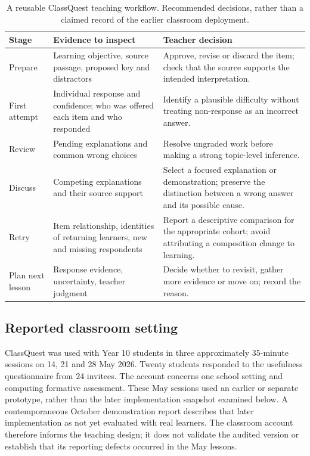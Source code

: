 \begin{table}[t]
\caption{A reusable ClassQuest teaching workflow. Recommended decisions, rather than a claimed record of the earlier classroom deployment.}
\label{tab:workflow}
\begin{tabular}{@{}p{}p{}p{}@{}}
\toprule
Stage & Evidence to inspect & Teacher decision\\
\midrule
Prepare & Learning objective, source passage, proposed key and distractors & Approve, revise or discard the item; check that the source supports the intended interpretation.\\
First attempt & Individual response and confidence; who was offered each item and who responded & Identify a plausible difficulty without treating non-response as an incorrect answer.\\
Review & Pending explanations and common wrong choices & Resolve ungraded work before making a strong topic-level inference.\\
Discuss & Competing explanations and their source support & Select a focused explanation or demonstration; preserve the distinction between a wrong answer and its possible cause.\\
Retry & Item relationship, identities of returning learners, new and missing respondents & Report a descriptive comparison for the appropriate cohort; avoid attributing a composition change to learning.\\
Plan next lesson & Response evidence, uncertainty, teacher judgment & Decide whether to revisit, gather more evidence or move on; record the reason.\\
\bottomrule
\end{tabular}
\end{table}

\subsection{Reported classroom setting}
ClassQuest was used with Year 10 students in three approximately 35-minute sessions on 14, 21 and 28 May 2026. Twenty students responded to the usefulness questionnaire from 24 invitees. The account concerns one school setting and computing formative assessment. These May sessions used an earlier or separate prototype, rather than the later implementation snapshot examined below. A contemporaneous October demonstration report describes that later implementation as not yet evaluated with real learners. The classroom account therefore informs the teaching design; it does not validate the audited version or establish that its reporting defects occurred in the May lessons.

